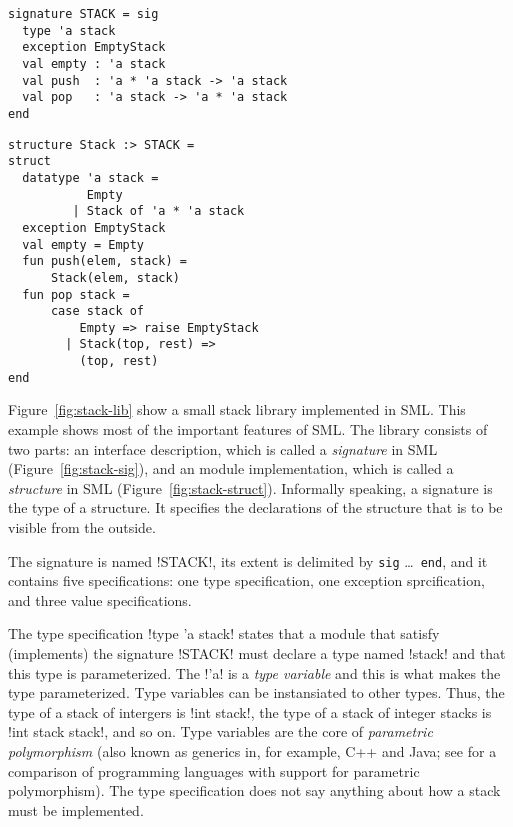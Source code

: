 \documentclass[workingdraft]{usetex-v1}
\begin{document}
\begin{figure*}[thp]
\mbox{}\hfill{}

\begin{subfloat}
\begin{minipage}[b]{.46\linewidth}
\begin{verbatim}
signature STACK = sig 
  type 'a stack
  exception EmptyStack
  val empty : 'a stack
  val push  : 'a * 'a stack -> 'a stack
  val pop   : 'a stack -> 'a * 'a stack
end
\end{verbatim}
\end{minipage}
\caption{\label{fig:stack-sig}interface}
\end{subfloat}
\qquad
\begin{subfloat}
\begin{minipage}[b]{.46\linewidth}
\begin{verbatim}
structure Stack :> STACK =
struct
  datatype 'a stack =
           Empty
         | Stack of 'a * 'a stack
  exception EmptyStack
  val empty = Empty
  fun push(elem, stack) = 
      Stack(elem, stack)
  fun pop stack =
      case stack of
          Empty => raise EmptyStack
        | Stack(top, rest) => 
          (top, rest)
end
\end{verbatim}
\end{minipage}
\caption{\label{fig:stack-struct}implementation}
\end{subfloat}
\hfill\mbox{}
\caption{Simple stack library implemented in SML.}
  \label{fig:stack-lib}
\end{figure*}

Figure~\ref{fig:stack-lib} show a small stack library implemented in
SML.  This example shows most of the important features of SML.  The
library consists of two parts: an interface description, which is
called a \emph{signature} in SML (Figure~\ref{fig:stack-sig}), and an
module implementation, which is called a \emph{structure} in SML
(Figure~\ref{fig:stack-struct}).  Informally speaking, a
signature is the type of a structure. It specifies the
declarations of the structure that is to be visible from the outside.


The signature is named !STACK!, its extent is delimited by
\texttt{sig} \ldots\ \texttt{end}, and it contains five
specifications: one type specification, one exception sprcification,
and three value specifications.

The type specification !type 'a stack! states that a module that
satisfy (implements) the signature !STACK! must declare a type named
!stack! and that this type is parameterized.  The !'a! is a \emph{type
  variable} and this is what makes the type parameterized.  Type
variables can be instansiated to other types.  Thus, the type of a
stack of intergers is !int stack!, the type of a stack of integer
stacks is !int stack stack!, and so on. Type variables are the core of
\emph{parametric polymorphism} (also known as generics in, for
example, C++ and Java; see \cite{garcia03:generics} for a comparison
of programming languages with support for parametric polymorphism).
The type specification does not say anything about how a stack must be
implemented.
\end{document}
